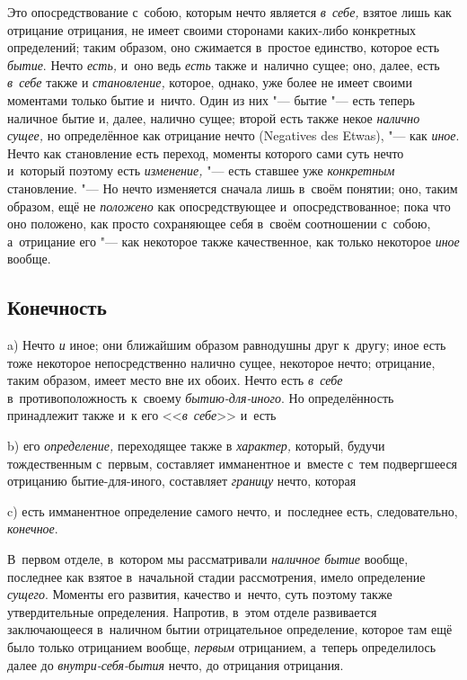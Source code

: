 Это опосредствование с~собою, которым нечто является {\em в~себе,} взятое лишь
как отрицание отрицания, не имеет своими сторонами каких-либо конкретных
определений; таким образом, оно сжимается в~простое единство, которое есть
{\em бытие}. Нечто {\em есть,} и~оно ведь {\em есть} также и~налично сущее;
оно, далее, есть {\em в~себе} также и {\em становление,} которое, однако, уже
более не имеет своими моментами только бытие и~ничто. Один из них "--- бытие
"--- есть теперь наличное бытие и, далее, налично сущее; второй есть также
некое {\em налично сущее,} но определённое как отрицание нечто (Nega\-tives des
Etwas), "--- как {\em иное}. Нечто как становление есть переход, моменты
которого сами суть нечто и~который поэтому есть {\em изменение,} "--- есть
ставшее уже {\em конкретным} становление. "--- Но нечто изменяется сначала лишь
в~своём понятии; оно, таким образом, ещё не {\em положено} как опосредствующее
и~опосредствованное; пока что оно положено, как просто сохраняющее себя в~своём
соотношении с~собою, а~отрицание его "--- как некоторое также качественное, как
только некоторое {\em иное} вообще.

\subsection{Конечность}

a) Нечто {\em и} иное; они ближайшим образом равнодушны друг к~другу; иное есть
тоже некоторое непосредственно налично сущее, некоторое нечто; отрицание, таким
образом, имеет место вне их обоих. Нечто есть {\em в~себе} в~противоположность
к~своему {\em бытию-для-иного}. Но определённость принадлежит также и~к его
<<{\em в~себе}>> и~есть

b) его {\em определение,} переходящее также в {\em характер,} который, будучи
тождественным с~первым, составляет имманентное и~вместе с~тем подвергшееся
отрицанию бытие-для-иного, составляет {\em границу} нечто, которая

c) есть имманентное определение самого нечто, и~последнее есть,
следовательно, {\em конечное}.

В~первом отделе, в~котором мы рассматривали {\em наличное бытие} вообще,
последнее как взятое в~начальной стадии рассмотрения, имело определение
{\em сущего}. Моменты его развития, качество и~нечто, суть поэтому также
утвердительные определения. Напротив, в~этом отделе развивается заключающееся
в~наличном бытии отрицательное определение, которое там ещё было только
отрицанием вообще, {\em первым} отрицанием, а~теперь определилось далее до
{\em внутри-себя-бытия} нечто, до отрицания отрицания.


